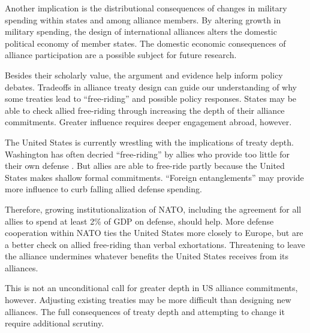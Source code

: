 \documentclass[12pt]{article}
\begin{document}
Another implication is the distributional consequences of changes in military spending within states and among alliance members.  
By altering growth in military spending, the design of international alliances alters the domestic political economy of member states. 
The domestic economic consequences of alliance participation are a possible subject for future research. 


Besides their scholarly value, the argument and evidence help inform policy debates. 
Tradeoffs in alliance treaty design can guide our understanding of why some treaties lead to ``free-riding'' and possible policy responses. 
States may be able to check allied free-riding through increasing the depth of their alliance commitments. 
Greater influence requires deeper engagement abroad, however. 


The United States is currently wrestling with the implications of treaty depth. 
Washington has often decried ``free-riding'' by allies who provide too little for their own defense \citep{Lanoszka2015}. 
But allies are able to free-ride partly because the United States makes shallow formal commitments. 
``Foreign entanglements'' may provide more influence to curb falling allied defense spending. 

 
Therefore, growing institutionalization of NATO, including the agreement for all allies to spend at least 2\% of GDP on defense, should help.
More defense cooperation within NATO ties the United States more closely to Europe, but are a better check on allied free-riding than verbal exhortations. 
Threatening to leave the alliance undermines whatever benefits the United States receives from its alliances. 

 
This is not an unconditional call for greater depth in US alliance commitments, however. 
Adjusting existing treaties may be more difficult than designing new alliances. 
The full consequences of treaty depth and attempting to change it require additional scrutiny. 

 



\singlespace
 
 
\end{document}
